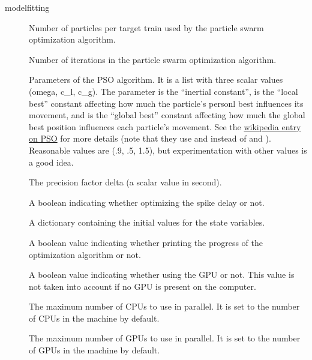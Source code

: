 \documentclass[letterpaper,10pt,english]{manual}
\begin{document}
\begin{funcdesc}{modelfitting}
\begin{description}
\item[] \leavevmode
Number of particles per target train used by the particle swarm optimization algorithm.

\item[] \leavevmode
Number of iterations in the particle swarm optimization algorithm.

\item[] \leavevmode
Parameters of the PSO algorithm. It is a list with three scalar values (omega, c\_l, c\_g).
The parameter  is the ``inertial constant'',  is the ``local best''
constant affecting how much the particle's personl best influences its movement, and
 is the ``global best'' constant affecting how much the global best
position influences each particle's movement. See the
\href{http://en.wikipedia.org/wiki/Particle\_swarm\_optimization}{wikipedia entry on PSO}
for more details (note that they use  and  instead of 
and ). Reasonable values are (.9, .5, 1.5), but experimentation
with other values is a good idea.

\item[] \leavevmode
The precision factor delta (a scalar value in second).

\item[] \leavevmode
A boolean indicating whether optimizing the spike delay or not.

\item[] \leavevmode
A dictionary containing the initial values for the state variables.

\item[] \leavevmode
A boolean value indicating whether printing the progress of the optimization algorithm or not.

\item[] \leavevmode
A boolean value indicating whether using the GPU or not. This value is not taken into account
if no GPU is present on the computer.

\item[] \leavevmode
The maximum number of CPUs to use in parallel. It is set to the number of CPUs in the machine by default.

\item[] \leavevmode
The maximum number of GPUs to use in parallel. It is set to the number of GPUs in the machine by default.


\end{description}
\end{funcdesc}
\end{document}
